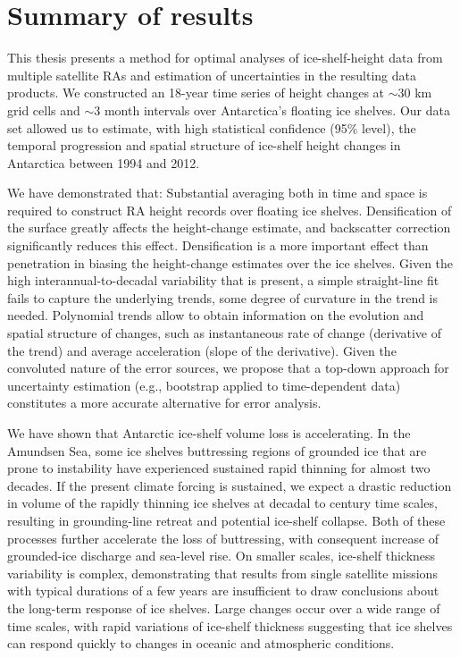 \section*{Summary of results}

This thesis presents a method for optimal analyses of ice-shelf-height data from multiple satellite RAs and estimation of uncertainties in the resulting data products. We constructed an 18-year time series of height changes at $\sim$30 km grid cells and $\sim$3 month intervals over Antarctica's floating ice shelves. Our data set allowed us to estimate, with high statistical confidence (95\% level), the temporal progression and spatial structure of ice-shelf height changes in Antarctica between 1994 and 2012.

We have demonstrated that: Substantial averaging both in time and space is required to construct RA height records over floating ice shelves. Densification of the surface greatly affects the height-change estimate, and backscatter correction significantly reduces this effect. Densification is a more important effect than penetration in biasing the height-change estimates over the ice shelves. Given the high interannual-to-decadal variability that is present, a simple straight-line fit fails to capture the underlying trends, some degree of curvature in the trend is needed. Polynomial trends allow to obtain information on the evolution and spatial structure of changes, such as instantaneous rate of change (derivative of the trend) and average acceleration (slope of the derivative). Given the convoluted nature of the error sources, we propose that a top-down approach for uncertainty estimation (e.g., bootstrap applied to time-dependent data) constitutes a more accurate alternative for error analysis.

We have shown that Antarctic ice-shelf volume
loss is accelerating. In the Amundsen Sea,
some ice shelves buttressing regions of grounded
ice that are prone to instability have experienced
sustained rapid thinning for almost two decades.
If the present climate forcing is sustained, we
expect a drastic reduction in volume of the rapidly
thinning ice shelves at decadal to century
time scales, resulting in grounding-line retreat
and potential ice-shelf collapse. Both of these processes
further accelerate the loss of buttressing,
with consequent increase of grounded-ice
discharge and sea-level rise. On smaller scales,
ice-shelf thickness variability is complex, demonstrating
that results from single satellite missions
with typical durations of a few years are
insufficient to draw conclusions about the long-term
response of ice shelves. Large changes occur
over a wide range of time scales, with rapid variations
of ice-shelf thickness suggesting that ice
shelves can respond quickly to changes in oceanic
and atmospheric conditions.

